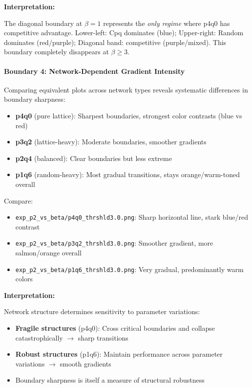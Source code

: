 \documentclass[12pt,a4paper]{article}
\begin{document}
\textbf{Interpretation:}

The diagonal boundary at $\beta=1$ represents the \textit{only regime} where p4q0 has competitive advantage. Lower-left: Cpq dominates (blue); Upper-right: Random dominates (red/purple); Diagonal band: competitive (purple/mixed). This boundary completely disappears at $\beta \geq 3$.

\paragraph{Boundary 4: Network-Dependent Gradient Intensity}

Comparing equivalent plots across network types reveals systematic differences in boundary sharpness:

\begin{itemize}
    \item \textbf{p4q0} (pure lattice): Sharpest boundaries, strongest color contrasts (blue vs red)
    \item \textbf{p3q2} (lattice-heavy): Moderate boundaries, smoother gradients
    \item \textbf{p2q4} (balanced): Clear boundaries but less extreme
    \item \textbf{p1q6} (random-heavy): Most gradual transitions, stays orange/warm-toned overall
\end{itemize}

Compare:
\begin{itemize}
    \item \texttt{exp\_p2\_vs\_beta/p4q0\_thrshld3.0.png}: Sharp horizontal line, stark blue/red contrast
    \item \texttt{exp\_p2\_vs\_beta/p3q2\_thrshld3.0.png}: Smoother gradient, more salmon/orange overall
    \item \texttt{exp\_p2\_vs\_beta/p1q6\_thrshld3.0.png}: Very gradual, predominantly warm colors
\end{itemize}

\textbf{Interpretation:}

Network structure determines sensitivity to parameter variations:
\begin{itemize}
    \item \textbf{Fragile structures} (p4q0): Cross critical boundaries and collapse catastrophically $\to$ sharp transitions
    \item \textbf{Robust structures} (p1q6): Maintain performance across parameter variations $\to$ smooth gradients
    \item Boundary sharpness is itself a measure of structural robustness
\end{itemize}
\end{document}
